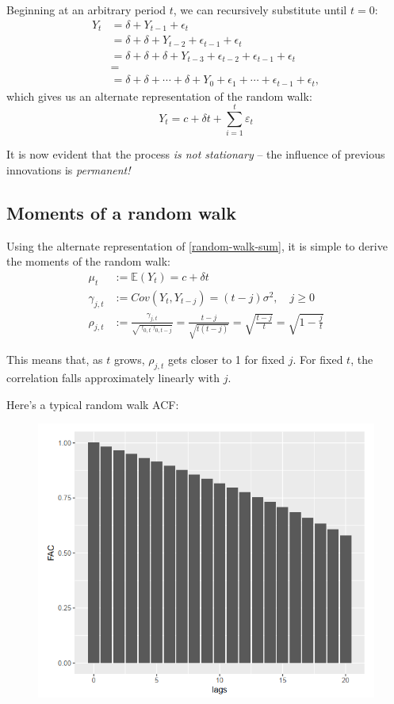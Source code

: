 \documentclass[11pt, a4paper]{report}
\theoremstyle{plain}
\theoremstyle{plain}
\theoremstyle{remark}
\begin{document}
Beginning at an arbitrary period $t$, we can recursively substitute until $t=0$:
$$\begin{aligned}
	Y_{t} &=\delta+Y_{t-1}+\epsilon_{t} \\
	&=\delta+\delta+Y_{t-2}+\epsilon_{t-1}+\epsilon_{t} \\
	&=\delta+\delta+\delta+Y_{t-3}+\epsilon_{t-2}+\epsilon_{t-1}+\epsilon_{t} \\
	&=\\
	&=\delta+\delta+\cdots+\delta+Y_{0}+\epsilon_{1}+\cdots+\epsilon_{t-1}+\epsilon_{t},
\end{aligned}$$
which gives us an alternate representation of the random walk:
\begin{equation} 
	\label{random-walk-sum}
	Y_t = c + \delta t + \sum_{i=1}^{t} \varepsilon_{t}
\end{equation}

It is now evident that the process \textit{is not stationary} -- the influence of previous innovations is \textit{permanent!}

\subsection{Moments of a random walk}

Using the alternate representation of \ref{random-walk-sum}, it is simple to derive the moments of the random walk:
$$\begin{aligned}
	\mu_{t} &:=\mathbb{E}\left(Y_{t}\right)=c+\delta t \\
	\gamma_{j, t} &:=Cov\left(Y_{t}, Y_{t-j}\right)=(t-j) \sigma^{2}, \quad j \geq 0 \\
	\rho_{j, t} &:=\frac{\gamma_{j, t}}{\sqrt{\gamma_{0, t} \gamma_{0, t-j}}}=\frac{t-j}{\sqrt{t(t-j)}}=\sqrt{\frac{t-j}{t}}=\sqrt{1-\frac{j}{t}}
\end{aligned}$$

This means that, as $t$ grows, $\rho_{j,t}$ gets closer to 1 for fixed $j$. For fixed $t$, the correlation falls approximately linearly with $j$.

Here's a typical random walk ACF:

\begin{figure}
	\centering
	\includegraphics[width=0.6\linewidth]{"fac random walk"}
	\label{fig:fac-random-walk}
\end{figure}
\end{document}
